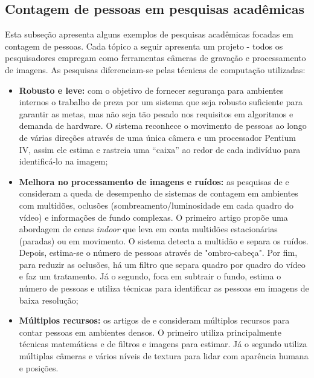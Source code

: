 \subsection{Contagem de pessoas em pesquisas acadêmicas}
 Esta subseção apresenta alguns exemplos de pesquisas acadêmicas focadas em contagem de pessoas. Cada tópico a seguir apresenta um projeto - todos os pesquisadores empregam como ferramentas câmeras de gravação e processamento de imagens. As pesquisas diferenciam-se pelas técnicas de computação utilizadas:

\begin{itemize}

  \item \textbf{Robusto e leve:} com o objetivo de fornecer segurança para ambientes internos o trabalho de  preza por um sistema que seja robusto suficiente para garantir as metas, mas não seja tão pesado nos requisitos em algoritmos e demanda de hardware. O sistema reconhece o movimento de pessoas ao longo de várias direções através de uma única câmera e um processador Pentium IV, assim ele estima e rastreia uma ``caixa'' ao redor de cada indivíduo para identificá-lo na imagem;

  \item \textbf{Melhora no processamento de imagens e ruídos:} as pesquisas de  e  consideram a queda de desempenho de sistemas de contagem em ambientes com multidões, oclusões (sombreamento/luminosidade em cada quadro do vídeo) e informações de fundo complexas. O primeiro artigo propõe uma abordagem de cenas \emph{indoor} que leva em conta multidões estacionárias (paradas) ou em movimento. O sistema detecta a multidão e separa os ruídos. Depois, estima-se o número de pessoas através de "ombro-cabeça". Por fim, para reduzir as oclusões, há um filtro que separa quadro por quadro do vídeo e faz um tratamento. Já o segundo, foca em subtrair o fundo, estima o número de pessoas e utiliza técnicas para identificar as pessoas em imagens de baixa resolução;

  \item \textbf{Múltiplos recursos:} os artigos de  e  consideram múltiplos recursos para contar pessoas em ambientes densos. O primeiro utiliza principalmente técnicas matemáticas e de filtros e imagens para estimar. Já o segundo utiliza
  múltiplas câmeras e vários níveis de textura para lidar com aparência humana e posições.

\end{itemize}

